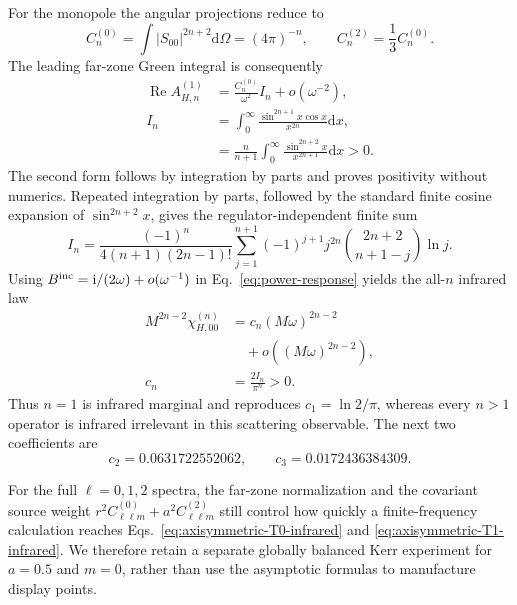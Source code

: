 \documentclass[aps,prd,twocolumn,10pt,nofootinbib,superscriptaddress,floatfix]{revtex4-2}
\newcommand{\dd}{\mathrm{d}}
\newcommand{\ii}{\mathrm{i}}
\begin{document}
For the monopole the angular projections reduce to
\begin{equation}
 C_n^{(0)}=\int|S_{00}|^{2n+2}\dd\Omega=(4\pi)^{-n},
 \qquad C_n^{(2)}=\frac13C_n^{(0)}.
 \label{eq:power-angular}
\end{equation}
The leading far-zone Green integral is consequently
\begin{align}
 \operatorname{Re}A_{H,n}^{(1)}
 &=\frac{C_n^{(0)}}{\omega^2}I_n+o(\omega^{-2}),\nonumber\\
 I_n&=\int_0^\infty
 \frac{\sin^{2n+1}x\cos x}{x^{2n}}\dd x,\nonumber\\
 &=\frac{n}{n+1}\int_0^\infty
 \frac{\sin^{2n+2}x}{x^{2n+1}}\dd x>0.
 \label{eq:power-integral}
\end{align}
The second form follows by integration by parts and proves positivity without
numerics.  Repeated integration by parts, followed by the standard finite
cosine expansion of $\sin^{2n+2}x$, gives the regulator-independent finite sum
\begin{equation}
 I_n=\frac{(-1)^n}{4(n+1)(2n-1)!}
 \sum_{j=1}^{n+1}(-1)^{j+1}j^{2n}
 \binom{2n+2}{n+1-j}\ln j .
 \label{eq:power-integral-sum}
\end{equation}
Using $B^{\rm inc}=\ii/(2\omega)+o(\omega^{-1})$ in
Eq.~\eqref{eq:power-response} yields the all-$n$ infrared law
\begin{align}
 M^{2n-2}\chi_{H,00}^{(n)}
 &=c_n(M\omega)^{2n-2}\nonumber\\
 &\quad+o\!\left((M\omega)^{2n-2}\right),
 \label{eq:power-infrared-law}\\
 c_n&=\frac{2I_n}{\pi^n}>0 .\nonumber
\end{align}
Thus $n=1$ is infrared marginal and reproduces $c_1=\ln2/\pi$,
whereas every $n>1$ operator is infrared irrelevant in this scattering
observable.  The next two coefficients are
\begin{equation}
 c_2=0.0631722552062,\qquad c_3=0.0172436384309.
 \label{eq:power-coefficients}
\end{equation}

For the full $\ell=0,1,2$ spectra, the far-zone normalization and the
covariant source weight
$r^2C^{(0)}_{\ell\ell m}+a^2C^{(2)}_{\ell\ell m}$ still control how quickly a
finite-frequency calculation reaches Eqs.~\eqref{eq:axisymmetric-T0-infrared}
and \eqref{eq:axisymmetric-T1-infrared}.  We therefore retain a separate
globally balanced Kerr experiment for $a=0.5$ and $m=0$, rather than use the
asymptotic formulas to manufacture display points.
\end{document}
